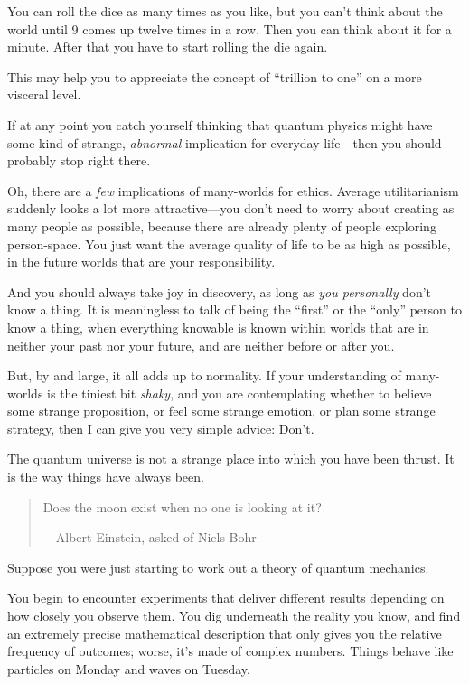 {
 You can roll the dice as many times as you like, but you
can't think about the world until 9 comes up twelve
times in a row. Then you can think about it for a minute. After that
you have to start rolling the die again.}

{
 This may help you to appreciate the concept of
``trillion to one'' on a more
visceral level.}

{
 If at any point you catch yourself thinking that quantum physics
might have some kind of strange, \textit{abnormal} implication for
everyday life---then you should probably stop right there.}

{
 Oh, there are a \textit{few} implications of many-worlds for
ethics. Average utilitarianism suddenly looks a lot more
attractive---you don't need to worry about creating as
many people as possible, because there are already plenty of people
exploring person-space. You just want the average quality of life to be
as high as possible, in the future worlds that are your
responsibility.}

{
 And you should always take joy in discovery, as long as
\textit{you personally} don't know a thing. It is
meaningless to talk of being the
``first'' or the
``only'' person to know a thing,
when everything knowable is known within worlds that are in neither
your past nor your future, and are neither before or after you.}

{
 But, by and large, it all adds up to normality. If your
understanding of many-worlds is the tiniest bit \textit{shaky}, and you
are contemplating whether to believe some strange proposition, or feel
some strange emotion, or plan some strange strategy, then I can give
you very simple advice: Don't.}

{
 The quantum universe is not a strange place into which you have
been thrust. It is the way things have always been.}

\myendsectiontext


\bigskip


\begin{quote}
{
 Does the moon exist when no one is looking at it?}

{\raggedleft
 {}---Albert Einstein, asked of Niels Bohr
\par}
\end{quote}


{
 Suppose you were just starting to work out a theory of quantum
mechanics.}

{
 You begin to encounter experiments that deliver different results
depending on how closely you observe them. You dig underneath the
reality you know, and find an extremely precise mathematical
description that only gives you the relative frequency of outcomes;
worse, it's made of complex numbers. Things behave like
particles on Monday and waves on Tuesday.}

